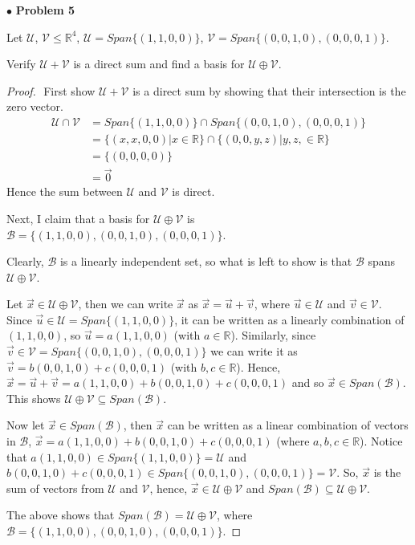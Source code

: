 \documentclass{article}
\begin{document}
\newpage
$ \bullet$ \textbf{Problem 5}
\medskip

\begin{itshape}
Let $\mathcal{U}$, $\mathcal{V} \le \mathbb{R}^4$, $\mathcal{U} = Span \{ (1,1,0,0) \}$, $\mathcal{V} = Span \{ (0,0,1,0), (0,0,0,1) \}$.

Verify $\mathcal{U} + \mathcal{V}$ is a direct sum and find a basis for $\mathcal{U} \oplus \mathcal{V}$.
\end{itshape}
\medskip

\begin{proof}
$ $\newline
First show $\mathcal{U} + \mathcal{V}$ is a direct sum by showing that their intersection is the zero vector.
\begin{align*}
\mathcal{U} \cap \mathcal{V} &= Span\{ (1,1,0,0) \} \cap Span\{ (0,0,1,0) , (0,0,0,1) \} \\
&= \{ (x,x,0,0) | x \in \mathbb{R} \} \cap \{ (0,0,y,z) | y,z, \in \mathbb{R} \} \\
&= \{ (0,0,0,0) \} \\
&= \vec{0}
\end{align*}
Hence the sum between $\mathcal{U}$ and $\mathcal{V}$ is direct.
\bigskip

Next, I claim that a basis for $\mathcal{U} \oplus \mathcal{V}$ is $\mathcal{B} = \{ (1,1,0,0), (0,0,1,0), (0,0,0,1) \}$.

Clearly, $\mathcal{B}$ is a linearly independent set, so what is left to show is that $\mathcal{B}$ spans $\mathcal{U} \oplus \mathcal{V}$.

Let $\vec{x} \in \mathcal{U} \oplus \mathcal{V}$, then we can write $\vec{x}$ as $\vec{x} = \vec{u} + \vec{v}$, where $\vec{u} \in \mathcal{U}$ and $\vec{v} \in \mathcal{V}$. Since $\vec{u} \in \mathcal{U} = Span\{ (1,1,0,0) \} $, it can be written as a linearly combination of $(1,1,0,0)$, so $\vec{u} = a(1,1,0,0)$ (with $a \in \mathbb{R}$). Similarly, since $\vec{v} \in \mathcal{V}=Span\{ (0,0,1,0), (0,0,0,1) \}$ we can write it as $\vec{v} = b(0,0,1,0) + c(0,0,0,1)$ (with $b, c \in \mathbb{R}$). Hence, $\vec{x} = \vec{u} +\vec{v} =  a(1,1,0,0) + b(0,0,1,0)+c(0,0,0,1)$ and so $\vec{x} \in Span(\mathcal{B})$. This shows $\mathcal{U} \oplus \mathcal{V} \subseteq Span(\mathcal{B})$.

Now let $\vec{x} \in Span(\mathcal{B})$, then $\vec{x}$ can be written as a linear combination of vectors in $\mathcal{B}$, $\vec{x} = a(1,1,0,0) + b(0,0,1,0)+ c(0,0,0,1)$ (where $a,b,c \in \mathbb{R}$). Notice that $a(1,1,0,0) \in Span\{ (1,1,0,0) \} = \mathcal{U}$ and $b(0,0,1,0) + c(0,0,0,1) \in Span \{ (0,0,1,0), (0,0,0,1) \} = \mathcal{V}$. So, $\vec{x}$ is the sum of vectors from $\mathcal{U}$ and $\mathcal{V}$, hence, $\vec{x} \in \mathcal{U} \oplus \mathcal{V}$ and $Span(\mathcal{B}) \subseteq \mathcal{U} \oplus \mathcal{V}$.

The above shows that $Span(\mathcal{B}) = \mathcal{U} \oplus \mathcal{V}$, where $\mathcal{B} = \{ (1,1,0,0), (0,0,1,0), (0,0, 0,1) \}$.
\end{proof}
\end{document}
